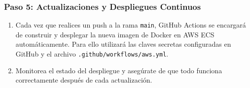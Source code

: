 \subsubsection{Paso 5: Actualizaciones y Despliegues Continuos}

\begin{enumerate}
	\item Cada vez que realices un push a la rama \texttt{main}, GitHub Actions se encargará de construir y desplegar la nueva imagen de Docker en AWS ECS automáticamente. Para ello utilizará las claves secretas configuradas en GitHub y el archivo \texttt{.github/workflows/aws.yml}.
	\item Monitorea el estado del despliegue y asegúrate de que todo funciona correctamente después de cada actualización.
\end{enumerate}




